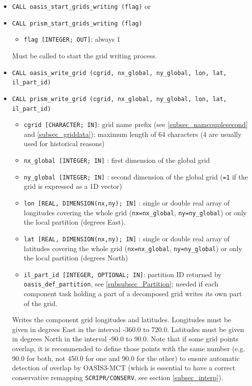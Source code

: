 \begin{itemize}

\item {\tt CALL oasis\_start\_grids\_writing (flag)} or
\item {\tt CALL prism\_start\_grids\_writing (flag)}
  \begin{itemize}
  \item {\tt flag [INTEGER; OUT]}: always 1 
  \end{itemize} 
Must be called to start the grid writing process. 
  
  \vspace{0.2cm}
\item {\tt CALL oasis\_write\_grid (cgrid, nx\_global, ny\_global, lon, lat, il\_part\_id)}
\item {\tt CALL prism\_write\_grid (cgrid, nx\_global, ny\_global, lon, lat, il\_part\_id)}
        
  \begin{itemize}
  \item {\tt cgrid [CHARACTER; IN]}: grid name prefix (see
    \ref{subsec_namcouplesecond} and \ref{subsec_griddata}); maximum length of 64 characters (4 are usually used for historical reasons)
  \item {\tt nx\_global [INTEGER; IN]} : first dimension of the global grid 
  \item {\tt ny\_global [INTEGER; IN]} : second dimension of the global grid ({\tt =1} if the grid is expressed as a 1D vector) 
  \item {\tt lon [REAL, DIMENSION(nx,ny); IN]} : single or double real array of longitudes covering the whole grid ({\tt nx=nx\_global}, {\tt ny=ny\_global}) or only the local partition (degrees East).
  \item {\tt lat [REAL, DIMENSION(nx,ny); IN]} : single or double real array of latitudes covering the whole grid ({\tt nx=nx\_global}, {\tt ny=ny\_global}) or only the local partition (degrees North)
\item  {\tt il\_part\_id [INTEGER, OPTIONAL; IN]}: partition ID returned by {\tt oasis\_def\_partition}, see \ref{subsubsec_Partition}; needed if each component task holding a part of a decomposed grid writes its own part of the grid.
  \end{itemize}

  Writes the component grid longitudes and latitudes. Longitudes must be
  given in degrees East in the interval -360.0 to 720.0. Latitudes
  must be given in degrees North in the interval -90.0 to 90.0. Note
  that if some grid points overlap, it is recommended to define those
  points with the same number (e.g. 90.0 for both, not 450.0 for one
  and 90.0 for the other) to ensure automatic detection of overlap by
  OASIS3-MCT (which is essential to have a correct conservative
  remapping \texttt{SCRIPR/CONSERV}, see section \ref{subsec_interp}).


\end{itemize}
